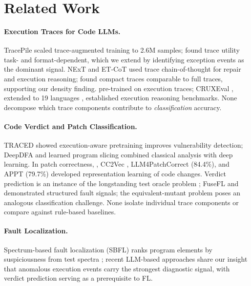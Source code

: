 \section{Related Work}

\paragraph{Execution Traces for Code LLMs.}
TracePile \citep{chen2025tracepile} scaled trace-augmented training to 2.6M samples; \citet{wang2025dcsh} found trace utility task- and format-dependent, which we extend by identifying exception events as the dominant signal.
NExT \citep{ni2024next} and ET-CoT \citep{eguchi2025etcot} used trace chain-of-thought for repair and execution reasoning; \citet{ferrando2025execute} found compact traces comparable to full traces, supporting our density finding.
\citet{liu2023codeexecution} pre-trained on execution traces; CRUXEval \citep{gu2024cruxeval}, extended to 19 languages \citep{xu2025cruxevalx}, established execution reasoning benchmarks.
None decompose which trace components contribute to \emph{classification} accuracy.

\paragraph{Code Verdict and Patch Classification.}
TRACED \citep{ding2024traced} showed execution-aware pretraining improves vulnerability detection; DeepDFA \citep{steenhoek2024deepdfa} and learned program slicing \citep{yadavally2024slicing} combined classical analysis with deep learning.
In patch correctness, \citet{tian2020patchcorrectness}, CC2Vec \citep{hoang2020cc2vec}, LLM4PatchCorrect \citep{zhou2024llm4patch} (84.4\%), and APPT \citep{appt2024} (79.7\%) developed representation learning of code changes.
Verdict prediction is an instance of the longstanding test oracle problem \citep{barr2015oracle}; FuseFL \citep{widyasari2024fusefl} and \citet{foster2025mutation} demonstrated structured fault signals; the equivalent-mutant problem \citep{papadakis2019mutation} poses an analogous classification challenge.
None isolate individual trace components or compare against rule-based baselines.

\paragraph{Fault Localization.}
Spectrum-based fault localization (SBFL) ranks program elements by suspiciousness from test spectra \citep{abreu2007accuracy,jones2002visualization,wong2014dstar}; recent LLM-based approaches \citep{kang2024autofl,qin2024agentfl} share our insight that anomalous execution events carry the strongest diagnostic signal, with verdict prediction serving as a prerequisite to FL.

